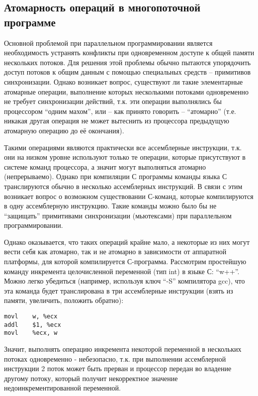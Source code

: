 \subsection{Атомарность операций в многопоточной программе}
\label{atomic:section}

Основной проблемой при параллельном программировании является необходимость устранять конфликты при одновременном доступе к общей памяти нескольких потоков. Для решения этой проблемы обычно пытаются упорядочить доступ потоков к общим данным с помощью специальных средств – примитивов синхронизации. Однако возникает вопрос, существуют ли такие элементарные атомарные операции, выполнение которых несколькими потоками одновременно не требует синхронизации действий, т.к. эти операции выполнялись бы процессором ``одним махом'', или – как принято говорить – ``атомарно'' (т.е. никакая другая операция не может вытеснить из процессора предыдущую атомарную операцию до её окончания).

Такими операциями являются практически все ассемблерные инструкции, т.к. они на низком уровне используют только те операции, которые присутствуют в системе команд процессора, а значит могут выполняться атомарно (непрерываемо). Однако при компиляции С программы команды языка С транслируются обычно в несколько ассемблерных инструкций. В связи с этим возникает вопрос о возможном существовании С-команд, которые компилируются в одну ассемблерную инструкцию. Такие команды можно было бы не ``защищать'' примитивами синхронизации (мьютексами) при параллельном программировании.

Однако оказывается, что таких операций крайне мало, а некоторые из них могут вести себя как атомарно, так и не атомарно в зависимости от аппаратной платформы, для которой компилируется С-программа. Рассмотрим простейшую команду инкремента целочисленной переменной (тип int) в языке С: ``w++''. Можно легко убедиться (например, используя ключ ``-S'' компилятора gcc), что эта команда будет транслирована в три ассемблерные инструкции (взять из памяти, увеличить, положить обратно):

\begin{verbatim}
movl	w, %ecx
addl	$1, %ecx
movl	%ecx, w
\end{verbatim}

Значит, выполнять операцию инкремента некоторой переменной в нескольких потоках одновременно - небезопасно, т.к. при выполнении ассемблерной инструкции 2 поток может быть прерван и процессор передан во владение другому потоку, который получит некорректное значение недоинкрементированной переменной.

